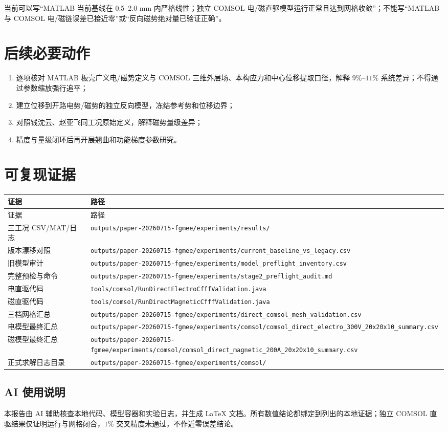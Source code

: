 \documentclass[UTF8,fontset=windows,11pt,a4paper]{ctexart}
\begin{document}
当前可以写“MATLAB 当前基线在 0.5--2.0 mm 内严格线性；独立 COMSOL 电/磁直驱模型运行正常且达到网格收敛”；不能写“MATLAB 与 COMSOL 电/磁链误差已接近零”或“反向磁势绝对量已验证正确”。

\section{后续必要动作}
\begin{enumerate}[label=\arabic*.]
\item 逐项核对 MATLAB 板壳广义电/磁势定义与 COMSOL 三维外层场、本构应力和中心位移提取口径，解释 $9\%$--$11\%$ 系统差异；不得通过参数缩放强行追平；
\item 建立位移到开路电势/磁势的独立反向模型，冻结参考势和位移边界；
\item 对照钱沈云、赵亚飞同工况原始定义，解释磁势量级差异；
\item 精度与量级闭环后再开展翘曲和功能梯度参数研究。
\end{enumerate}

\section{可复现证据}
\begin{longtable}{>{\raggedright\arraybackslash}p{}>{\raggedright\arraybackslash}p{}}
\toprule
证据 & 路径 \\
\midrule
\endfirsthead
\toprule
证据 & 路径 \\
\midrule
\endhead
三工况 CSV/MAT/日志 & \nolinkurl{outputs/paper-20260715-fgmee/experiments/results/} \\
版本漂移对照 & \nolinkurl{outputs/paper-20260715-fgmee/experiments/current_baseline_vs_legacy.csv} \\
旧模型审计 & \nolinkurl{outputs/paper-20260715-fgmee/experiments/model_preflight_inventory.csv} \\
完整预检与命令 & \nolinkurl{outputs/paper-20260715-fgmee/experiments/stage2_preflight_audit.md} \\
电直驱代码 & \nolinkurl{tools/comsol/RunDirectElectroCfffValidation.java} \\
磁直驱代码 & \nolinkurl{tools/comsol/RunDirectMagneticCfffValidation.java} \\
三档网格汇总 & \nolinkurl{outputs/paper-20260715-fgmee/experiments/direct_comsol_mesh_validation.csv} \\
电模型最终汇总 & \nolinkurl{outputs/paper-20260715-fgmee/experiments/comsol/comsol_direct_electro_300V_20x20x10_summary.csv} \\
磁模型最终汇总 & \nolinkurl{outputs/paper-20260715-fgmee/experiments/comsol/comsol_direct_magnetic_200A_20x20x10_summary.csv} \\
正式求解日志目录 & \nolinkurl{outputs/paper-20260715-fgmee/experiments/comsol/} \\
\bottomrule
\end{longtable}

\subsection*{AI 使用说明}
本报告由 AI 辅助核查本地代码、模型容器和实验日志，并生成 LaTeX 文档。所有数值结论都绑定到列出的本地证据；独立 COMSOL 直驱结果仅证明运行与网格闭合，$1\%$ 交叉精度未通过，不作近零误差结论。
\end{document}
